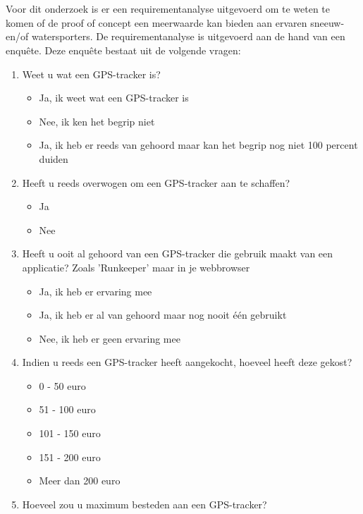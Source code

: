 \section{}
\label{ch:requirementAnalyse}
Voor dit onderzoek is er een requirementanalyse uitgevoerd om te weten te komen of de proof of concept een meerwaarde kan bieden aan ervaren sneeuw- en/of watersporters. De requirementanalyse is uitgevoerd aan de hand van een enquête. Deze enquête bestaat uit de volgende vragen:
\begin{enumerate}
	\item Weet u wat een GPS-tracker is?
		\begin{itemize}
			\item Ja, ik weet wat een GPS-tracker is
			\item Nee, ik ken het begrip niet
			\item Ja, ik heb er reeds van gehoord maar kan het begrip nog niet 100 percent duiden
		\end{itemize}
	\item Heeft u reeds overwogen om een GPS-tracker aan te schaffen?
		\begin{itemize}
			\item Ja
			\item Nee
		\end{itemize}
	\item Heeft u ooit al gehoord van een GPS-tracker die gebruik maakt van een applicatie? Zoals 'Runkeeper' maar in je webbrowser
		\begin{itemize}
			\item Ja, ik heb er ervaring mee
			\item Ja, ik heb er al van gehoord maar nog nooit één gebruikt
			\item Nee, ik heb er geen ervaring mee
		\end{itemize}
	\item Indien u reeds een GPS-tracker heeft aangekocht, hoeveel heeft deze gekost?
		\begin{itemize}
			\item 0 - 50 euro
			\item 51 - 100 euro
			\item 101 - 150 euro
			\item 151 - 200 euro
			\item Meer dan 200 euro
		\end{itemize}
	\item Hoeveel zou u maximum besteden aan een GPS-tracker?

\end{enumerate}
